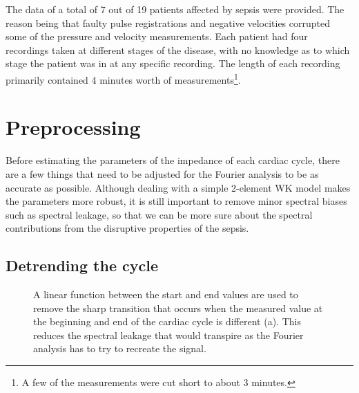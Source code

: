 The data of a total of 7 out of 19 patients affected by sepsis were provided. The reason being that faulty pulse registrations and negative velocities corrupted some of the pressure and velocity measurements. Each patient had four recordings taken at different stages of the disease, with no knowledge as to which stage the patient was in at any specific recording. The length of each recording primarily contained 4 minutes worth of measurements\footnote{A few of the measurements were cut short to about 3 minutes.}.

\section{Preprocessing}

Before estimating the parameters of the impedance of each cardiac cycle, there are a few things that need to be adjusted for the Fourier analysis to be as accurate as possible. Although dealing with a simple 2-element WK model makes the parameters more robust, it is still important to remove minor spectral biases such as spectral leakage, so that we can be more sure about the spectral contributions from the disruptive properties of the sepsis.

\subsection{Detrending the cycle}

\begin{figure}[h]
  \centering
      \hfill
  \caption{A linear function between the start and end values are used to remove the sharp transition that occurs when the measured value at the beginning and end of the cardiac cycle is different (a). This reduces the spectral leakage that would transpire as the Fourier analysis has to try to recreate the signal.}
  \label{fig:discontinuity}
\end{figure}

